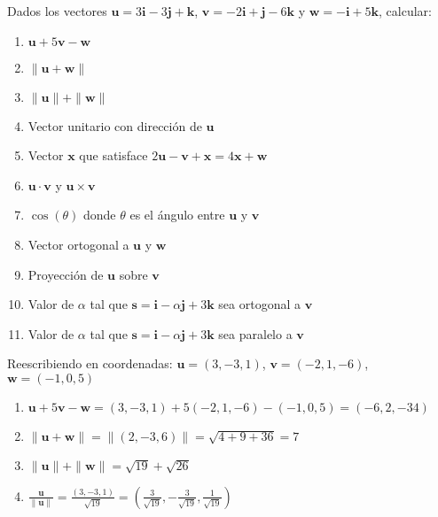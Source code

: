\begin{prob}
Dados los vectores $\mathbf{u} = 3\mathbf{i} - 3\mathbf{j} + \mathbf{k}$, $\mathbf{v} = -2\mathbf{i} + \mathbf{j} - 6\mathbf{k}$ y $\mathbf{w} = -\mathbf{i} + 5\mathbf{k}$, calcular:

\begin{multicols}{2}
\begin{enumerate}[$(a)$]
    \item $\mathbf{u} + 5\mathbf{v} - \mathbf{w}$
    \item $\|\mathbf{u} + \mathbf{w}\|$
    \item $\|\mathbf{u}\| + \|\mathbf{w}\|$
    \item Vector unitario con dirección de $\mathbf{u}$
    \item Vector $\mathbf{x}$ que satisface $2\mathbf{u} - \mathbf{v} + \mathbf{x} = 4\mathbf{x} + \mathbf{w}$
    \item $\mathbf{u} \cdot \mathbf{v}$ y $\mathbf{u} \times \mathbf{v}$
    \item $\cos(\theta)$ donde $\theta$ es el ángulo entre $\mathbf{u}$ y $\mathbf{v}$
    \item Vector ortogonal a $\mathbf{u}$ y $\mathbf{w}$
    \item Proyección de $\mathbf{u}$ sobre $\mathbf{v}$
    \item Valor de $\alpha$ tal que $\mathbf{s} = \mathbf{i} - \alpha\mathbf{j} + 3\mathbf{k}$ sea ortogonal a $\mathbf{v}$
    \item Valor de $\alpha$ tal que $\mathbf{s} = \mathbf{i} - \alpha\mathbf{j} + 3\mathbf{k}$ sea paralelo a $\mathbf{v}$
\end{enumerate}
\end{multicols}

\begin{myproof}
Reescribiendo en coordenadas: $\mathbf{u} = (3,-3,1)$, $\mathbf{v} = (-2,1,-6)$, $\mathbf{w} = (-1,0,5)$

\begin{enumerate}[$(a)$]
\item $\mathbf{u} + 5\mathbf{v} - \mathbf{w} = (3,-3,1) + 5(-2,1,-6) - (-1,0,5) = (-6,2,-34)$

\item $\|\mathbf{u} + \mathbf{w}\| = \|(2,-3,6)\| = \sqrt{4 + 9 + 36} = 7$

\item $\|\mathbf{u}\| + \|\mathbf{w}\| = \sqrt{19} + \sqrt{26}$

\item $\frac{\mathbf{u}}{\|\mathbf{u}\|} = \frac{(3,-3,1)}{\sqrt{19}} = \left(\frac{3}{\sqrt{19}}, -\frac{3}{\sqrt{19}}, \frac{1}{\sqrt{19}}\right)$


\end{enumerate}
\end{myproof}
\end{prob}
